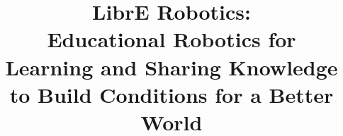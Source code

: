 \documentclass[letterpaper,times,numbered,print,custommargin]{Classes/PhDThesisPSnPDF}
\title{
LibrE Robotics: \\
\vspace{5mm}
\Large{Educational Robotics for\\
	Learning and Sharing Knowledge \\
	to Build Conditions for a Better World}\\
}
\begin{document}
\frontmatter
\begin{titlepage}
\maketitle
\end{titlepage}


\tableofcontents


\mainmatter


\backmatter 

\begin{spacing}{0.5}

\cleardoublepage
 
\end{spacing}


\begin{appendices} %
% 
\end{appendices}

\printthesisindex %
\end{document}
